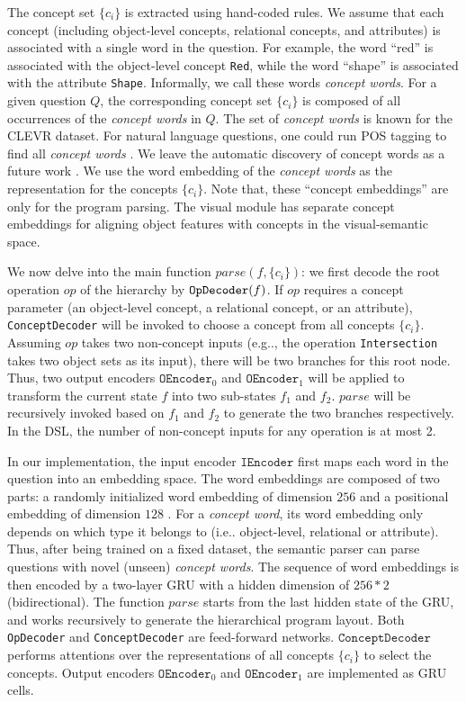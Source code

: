 \documentclass{article} %
\makeatletter
\DeclareRobustCommand\onedot{\futurelet\@let@token\@onedot}
\def\@onedot{\ifx\@let@token.\else.\null\fi\xspace}
\def\eg{e.g\onedot} \def\Eg{E.g\onedot}
\def\ie{i.e\onedot} \def\Ie{I.e\onedot}
\makeatother
\begin{document}
The concept set $\{c_i\}$ is extracted using hand-coded rules. We assume that each concept (including object-level concepts, relational concepts, and attributes) is associated with a single word in the question. For example, the word ``red'' is associated with the object-level concept {\tt Red}, while the word ``shape'' is associated with the attribute {\tt Shape}. Informally, we call these words {\it concept words}. For a given question $Q$, the corresponding concept set $\{c_i\}$ is composed of all occurrences of the {\it concept words} in $Q$.
The set of {\it concept words} is known for the CLEVR dataset. For natural language questions, one could run POS tagging to find all {\it concept words} \citep{Andreas2016Learning,Schuster2015Generating}. We leave the automatic discovery of concept words as a future work \citep{gauthier2018word}. We use the word embedding of the {\it concept words} as the representation for the concepts $\{c_i\}$. Note that, these ``concept embeddings'' are only for the program parsing. The visual module has separate concept embeddings for aligning object features with concepts in the visual-semantic space.

We now delve into the main function $parse(f, \{c_i\})$: we first decode the root operation $op$ of the hierarchy by ${\tt OpDecoder}(f)$. If $op$ requires a concept parameter (an object-level concept, a relational concept, or an attribute), {\tt ConceptDecoder} will be invoked to choose a concept from all concepts $\{c_i\}$. Assuming $op$ takes two non-concept inputs  (\eg, the operation {\tt Intersection} takes two object sets as its input), there will be two branches for this root node. Thus, two output encoders $\texttt{OEncoder}_0$ and $\texttt{OEncoder}_1$ will be applied to transform the current state $f$ into two sub-states $f_1$ and $f_2$. $parse$ will be recursively invoked based on $f_1$ and $f_2$ to generate the two branches respectively. In the DSL, the number of non-concept inputs for any operation is at most 2.

In our implementation, the input encoder $\texttt{IEncoder}$ first maps each word in the question into an embedding space. The word embeddings are composed of two parts: a randomly initialized word embedding of dimension $256$ and a positional embedding of dimension $128$ \citep{Gehring2017Convolutional}. For a {\it concept word}, its word embedding only depends on which type it belongs to (\ie object-level, relational or attribute). Thus, after being trained on a fixed dataset, the semantic parser can parse questions with novel (unseen) {\it concept words}. The sequence of word embeddings is then encoded by a two-layer GRU with a hidden dimension of $256 * 2$ (bidirectional). The function $parse$ starts from the last hidden state of the GRU, and works recursively to generate the hierarchical program layout. Both {\tt OpDecoder} and {\tt ConceptDecoder} are feed-forward networks. $\texttt{ConceptDecoder}$ performs attentions over the representations of all concepts $\{c_i\}$ to select the concepts. Output encoders $\texttt{OEncoder}_0$ and $\texttt{OEncoder}_1$ are implemented as GRU cells. 
\end{document}
